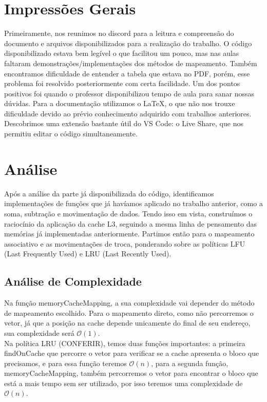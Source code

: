 \documentclass{article}
\begin{document}
\section{Impressões Gerais}
Primeiramente, nos reunimos no discord para a leitura e compreensão do documento e arquivos disponibilizados para a realização do trabalho.
O código disponibilizado estava bem legível o que facilitou um pouco, mas nas aulas faltaram demonstrações/implementações dos métodos de mapeamento. 
Também encontramos dificuldade de entender a tabela que estava no PDF, porém, esse problema foi resolvido posteriormente com certa facilidade. Um dos pontos positivos foi quando o professor disponibilizou tempo de aula para sanar nossas dúvidas.
Para a documentação utilizamos o \LaTeX, o que não nos trouxe dificuldade devido ao prévio conhecimento adquirido com trabalhos anteriores. 
Descobrimos uma extensão bastante útil do VS Code: o Live Share, que nos permitiu editar o código simultaneamente.
\clearpage
\section{Análise}

Após a análise da parte já disponibilizada do código, identificamos implementações de funções que já havíamos aplicado no trabalho anterior, como a soma, subtração e movimentação de dados.
Tendo isso em vista, construímos o raciocínio da aplicação da cache L3, seguindo a mesma linha de pensamento das memórias já implementadas anteriormente. 
Partimos então para o mapeamento associativo e as movimentações de troca, ponderando sobre as políticas LFU (Last Frequently Used) e LRU (Last Recently Used).

\subsection{Análise de Complexidade}
Na função memoryCacheMapping, a sua complexidade vai depender do método de mapeamento escolhido. Para o mapeamento direto, 
como não percorremos o vetor, já que a posição na cache depende unicamente do final de seu endereço, 
sua complexidade será $\mathcal{O}(1)$. \\

Na política LRU (CONFERIR), temos duas funções importantes: a primeira
findOnCache que percorre o vetor para verificar se a cache apresenta o bloco que precisamos, e para essa função teremos $\mathcal{O}(n)$,
para a segunda função, memoryCacheMapping, também percorremos o vetor para encontrar o bloco que está a mais tempo sem ser utilizado, por isso 
teremos uma complexidade de $\mathcal{O}(n)$. \\
\end{document}
